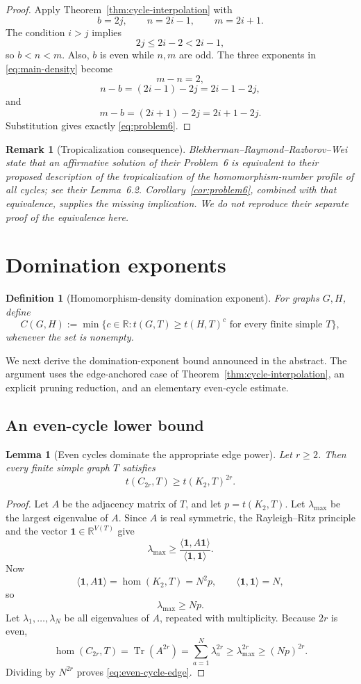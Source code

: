 \documentclass[11pt]{article}
\newtheorem{lemma}[theorem]{Lemma}
\newtheorem{remark}[theorem]{Remark}
\newtheorem{definition}[theorem]{Definition}
\newcommand{\homn}{\operatorname{hom}}
\newcommand{\tr}{\operatorname{Tr}}
\newcommand{\RR}{\mathbb{R}}
\newcommand{\1}{\mathbf{1}}
\begin{document}
\begin{proof}
Apply Theorem~\ref{thm:cycle-interpolation} with
\[
  b=2j,
  \qquad
  n=2i-1,
  \qquad
  m=2i+1.
\]
The condition $i>j$ implies
\[
  2j\le2i-2<2i-1,
\]
so $b<n<m$.  Also, $b$ is even while $n,m$ are odd.  The three exponents in
\eqref{eq:main-density} become
\[
  m-n=2,
\]
\[
  n-b=(2i-1)-2j=2i-1-2j,
\]
and
\[
  m-b=(2i+1)-2j=2i+1-2j.
\]
Substitution gives exactly \eqref{eq:problem6}.
\end{proof}

\begin{remark}[Tropicalization consequence]
Blekherman--Raymond--Razborov--Wei state that an affirmative solution of their
Problem~6 is equivalent to their proposed description of the tropicalization
of the homomorphism-number profile of all cycles; see their Lemma~6.2.
Corollary~\ref{cor:problem6}, combined with that equivalence, supplies the
missing implication.  We do not reproduce their separate proof of the
equivalence here.
\end{remark}

\section{Domination exponents}

\begin{definition}[Homomorphism-density domination exponent]
For graphs $G,H$, define
\[
  C(G,H)
  :=
  \min\bigl\{c\in\RR:
  t(G,T)\ge t(H,T)^c\text{ for every finite simple }T\bigr\},
\]
whenever the set is nonempty.
\end{definition}

We next derive the domination-exponent bound announced in the abstract.  The
argument uses the edge-anchored case of
Theorem~\ref{thm:cycle-interpolation}, an explicit pruning reduction, and an
elementary even-cycle estimate.

\subsection{An even-cycle lower bound}

\begin{lemma}[Even cycles dominate the appropriate edge power]
\label{lem:even-cycle-edge}
Let $r\ge2$.  Then every finite simple graph $T$ satisfies
\[
  t(C_{2r},T)\ge t(K_2,T)^{2r}.
  \tag{7.1}\label{eq:even-cycle-edge}
\]
\end{lemma}

\begin{proof}
Let $A$ be the adjacency matrix of $T$, and let $p=t(K_2,T)$.  Let
$\lambda_{\max}$ be the largest eigenvalue of $A$.  Since $A$ is real
symmetric, the Rayleigh--Ritz principle and the vector $\1\in\RR^{V(T)}$ give
\[
  \lambda_{\max}
  \ge
  \frac{\langle\1,A\1\rangle}{\langle\1,\1\rangle}.
\]
Now
\[
  \langle\1,A\1\rangle=\homn(K_2,T)=N^2p,
  \qquad
  \langle\1,\1\rangle=N,
\]
so
\[
  \lambda_{\max}\ge Np.
\]
Let $\lambda_1,\ldots,\lambda_N$ be all eigenvalues of $A$, repeated with
multiplicity.  Because $2r$ is even,
\[
  \homn(C_{2r},T)
  =\tr(A^{2r})
  =\sum_{a=1}^N\lambda_a^{2r}
  \ge\lambda_{\max}^{2r}
  \ge (Np)^{2r}.
\]
Dividing by $N^{2r}$ proves \eqref{eq:even-cycle-edge}.
\end{proof}
\end{document}
